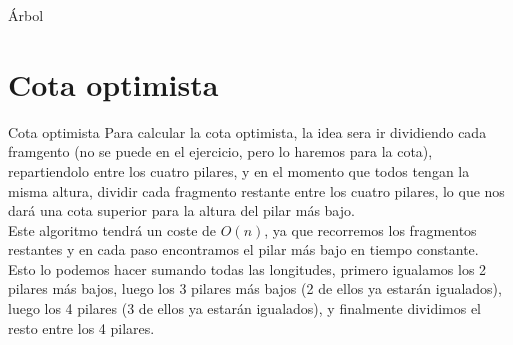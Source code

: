 \documentclass[aspectratio=169]{beamer}
\begin{document}
\begin{frame}{Árbol}
    \begin{center}
    \end{center}
\end{frame}

\section{Cota optimista}
\begin{frame}[fragile]{Cota optimista}
    Para calcular la cota optimista, la idea sera ir dividiendo cada framgento (no se puede en el ejercicio, pero lo haremos para la cota), repartiendolo entre los cuatro pilares, y en el momento que todos tengan la misma altura, dividir cada fragmento restante entre los cuatro pilares, lo que nos dará una cota superior para la altura del pilar más bajo.\\
    Este algoritmo tendrá un coste de $O(n)$, ya que recorremos los fragmentos restantes y en cada paso encontramos el pilar más bajo en tiempo constante.\\
    Esto lo podemos hacer sumando todas las longitudes, primero igualamos los 2 pilares más bajos, luego los 3 pilares más bajos (2 de ellos ya estarán igualados), luego los 4 pilares (3 de ellos ya estarán igualados), y finalmente dividimos el resto entre los 4 pilares.
\end{frame}
\end{document}
